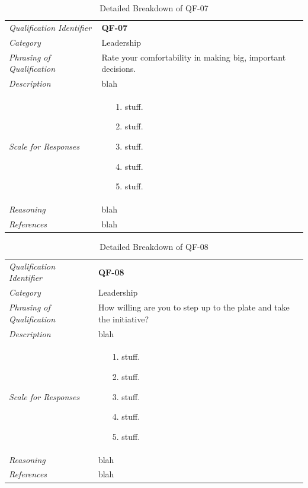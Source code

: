 \documentclass[12pt,letterpaper]{article}
\begin{document}
\begin{table}[H]
	\caption{Detailed Breakdown of QF-07}
	\begin{tabu} to 
		\toprule
		Qualification Identifier & {\bf QF-07}\\
		Category & Leadership \\
		Phrasing of Qualification & Rate your comfortability in making big, important decisions. \\
		Description & blah\\
		Scale for Responses &
		\begin{minipage}[t]{\linewidth}
			\begin{enumerate}
				\item[1.] stuff.
				\item[2.] stuff.
				\item[3.] stuff.
				\item[4.] stuff.
				\item[5.] stuff.
			\end{enumerate}
		\end{minipage}\\
		Reasoning & blah\\
		References & blah\\
		\toprule
	\end{tabu}
\end{table}

\begin{table}[H]
	\caption{Detailed Breakdown of QF-08}
	\begin{tabu} to 
		\toprule
		Qualification Identifier & {\bf QF-08}\\
		Category & Leadership \\
		Phrasing of Qualification & How willing are you to step up to the plate and take the initiative?\\
		Description & blah\\
		Scale for Responses &
		\begin{minipage}[t]{\linewidth}
			\begin{enumerate}
				\item[1.] stuff.
				\item[2.] stuff.
				\item[3.] stuff.
				\item[4.] stuff.
				\item[5.] stuff.
			\end{enumerate}
		\end{minipage}\\
		Reasoning & blah\\
		References & blah\\
		\toprule
	\end{tabu}
\end{table}
\end{document}

